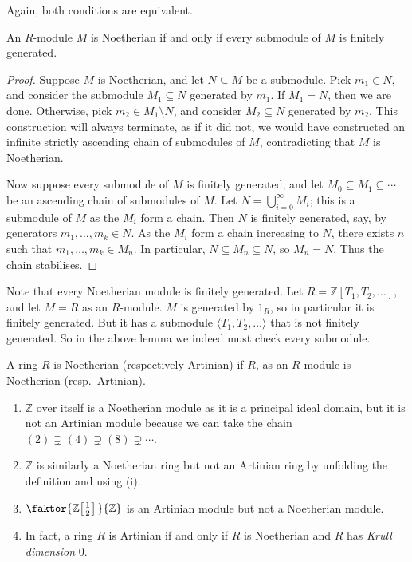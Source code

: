Again, both conditions are equivalent.
\begin{lemma}
    An \( R \)-module \( M \) is Noetherian if and only if every submodule of \( M \) is finitely generated.
\end{lemma}
\begin{proof}
    Suppose \( M \) is Noetherian, and let \( N \subseteq M \) be a submodule.
    Pick \( m_1 \in N \), and consider the submodule \( M_1 \subseteq N \) generated by \( m_1 \).
    If \( M_1 = N \), then we are done.
    Otherwise, pick \( m_2 \in M_1 \setminus N \), and consider \( M_2 \subseteq N \) generated by \( m_2 \).
    This construction will always terminate, as if it did not, we would have constructed an infinite strictly ascending chain of submodules of \( M \), contradicting that \( M \) is Noetherian.

    Now suppose every submodule of \( M \) is finitely generated, and let \( M_0 \subseteq M_1 \subseteq \cdots \) be an ascending chain of submodules of \( M \).
    Let \( N = \bigcup_{i = 0}^\infty M_i \); this is a submodule of \( M \) as the \( M_i \) form a chain.
    Then \( N \) is finitely generated, say, by generators \( m_1, \dots, m_k \in N \).
    As the \( M_i \) form a chain increasing to \( N \), there exists \( n \) such that \( m_1, \dots, m_k \in M_n \).
    In particular, \( N \subseteq M_n \subseteq N \), so \( M_n = N \).
    Thus the chain stabilises.
\end{proof}
Note that every Noetherian module is finitely generated.
Let \( R = \mathbb Z[T_1, T_2, \dots] \), and let \( M = R \) as an \( R \)-module.
\( M \) is generated by \( 1_R \), so in particular it is finitely generated.
But it has a submodule \( \langle T_1, T_2, \dots \rangle \) that is not finitely generated.
So in the above lemma we indeed must check every submodule.
\begin{definition}
    A ring \( R \) is Noetherian (respectively Artinian) if \( R \), as an \( R \)-module is Noetherian (resp.\ Artinian).
\end{definition}
\begin{example}
    \begin{enumerate}
        \item \( \mathbb Z \) over itself is a Noetherian module as it is a principal ideal domain, but it is not an Artinian module because we can take the chain \( (2) \supsetneq (4) \supsetneq (8) \supsetneq \cdots \).
        \item \( \mathbb Z \) is similarly a Noetherian ring but not an Artinian ring by unfolding the definition and using (i).
        \item \( \faktor{\mathbb Z\qty[\frac{1}{2}]\,}{\mathbb Z} \) is an Artinian module but not a Noetherian module.
        \item In fact, a ring \( R \) is Artinian if and only if \( R \) is Noetherian and \( R \) has \emph{Krull dimension} 0.
    \end{enumerate}
\end{example}

